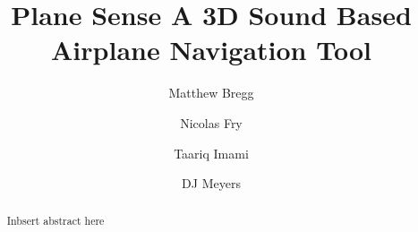 \documentclass[format=acmsmall, review=false, screen=true]{acmart}
\begin{document}
\title[Plane Sense]{Plane Sense \newline A 3D Sound Based Airplane Navigation Tool}

\author{Matthew Bregg}
\author{Nicolas Fry}
\author{Taariq Imami}
\author{DJ Meyers}

\begin{abstract}
  Inbsert abstract here
\end{abstract}






\maketitle

\renewcommand{\shortauthors}{M. Bregg T. Imami D. Meyers N. Fry}


\end{document}
